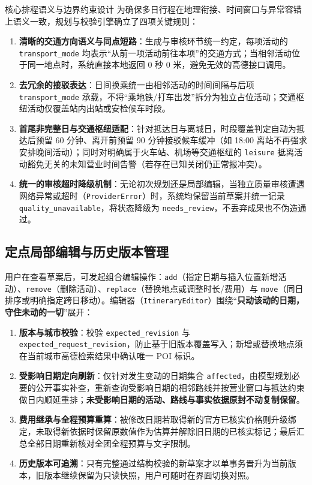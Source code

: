 \begin{designnote}{核心排程语义与边界约束设计}
  为确保多日行程在地理衔接、时间窗口与异常容错上语义一致，规划与校验引擎确立了四项关键规则：
  \begin{enumerate}
    \item \textbf{清晰的交通方向语义与同点短路}：生成与审核环节统一约定，每项活动的 \texttt{transport\_mode} 均表示“从前一项活动前往本项”的交通方式；当相邻活动位于同一地点时，系统直接本地返回 0 秒 0 米，避免无效的高德接口调用。
    \item \textbf{去冗余的接驳表达}：日间换乘统一由相邻活动的时间间隔与后项 \texttt{transport\_mode} 承载，不将“乘地铁/打车出发”拆分为独立占位活动；交通枢纽活动仅覆盖站内出站或安检候车时段。
    \item \textbf{首尾非完整日与交通枢纽适配}：针对抵达日与离城日，时段覆盖判定自动为抵达后预留 60 分钟、离开前预留 90 分钟接驳候车缓冲（如 18:00 离站不再强求安排晚间活动）；同时对明确属于火车站、机场等交通枢纽的 \texttt{leisure} 抵离活动豁免无关的未知营业时间告警（若存在已知关闭仍正常报冲突）。
    \item \textbf{统一的审核超时降级机制}：无论初次规划还是局部编辑，当独立质量审核遭遇网络异常或超时（\texttt{ProviderError}）时，系统均保留当前草案并统一记录 \texttt{quality\_unavailable}，将状态降级为 \texttt{needs\_review}，不丢弃成果也不伪造通过。
  \end{enumerate}
\end{designnote}

\subsection{定点局部编辑与历史版本管理}

用户在查看草案后，可发起组合编辑操作：\texttt{add}（指定日期与插入位置新增活动）、\texttt{remove}（删除活动）、\texttt{replace}（替换地点或调整时长/费用）与 \texttt{move}（同日排序或明确指定跨日移动）。编辑器（\texttt{ItineraryEditor}）围绕“\textbf{只动该动的日期，守住未动的一切}”展开：

\begin{enumerate}
  \item \textbf{版本与城市校验}：校验 \texttt{expected\_revision} 与 \texttt{expected\_request\_revision}，防止基于旧版本覆盖写入；新增或替换地点须在当前城市高德检索结果中确认唯一 POI 标识。
  \item \textbf{受影响日期定向刷新}：仅针对发生变动的日期集合 \texttt{affected}，由模型规划必要的公开事实补查，重新查询受影响日期的相邻路线并按营业窗口与抵达约束做日内顺延重排；\textbf{未受影响日期的活动、路线与事实依据原封不动复制保留}。
  \item \textbf{费用继承与全程预算重算}：被修改日期若取得新的官方已核实价格则升级绑定，未取得新依据时保留原数值作为估算并解除旧日期的已核实标记；最后汇总全部日期重新核对全团全程预算与文字限制。
  \item \textbf{历史版本可追溯}：只有完整通过结构校验的新草案才以单事务晋升为当前版本，旧版本继续保留为只读快照，用户可随时在界面切换对照。
\end{enumerate}

